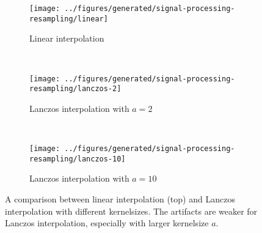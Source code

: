 

%
\begin{figure}
    \begin{subfigure}{\textwidth}
        \texttt{[image: ../figures/generated/signal-processing-resampling/linear]}
        \caption{Linear interpolation}
    \end{subfigure}
    ~
    \begin{subfigure}{\textwidth}
        \texttt{[image: ../figures/generated/signal-processing-resampling/lanczos-2]}
        \caption{Lanczos interpolation with $a=2$}
    \end{subfigure}
    ~
    \begin{subfigure}{\textwidth}
        \texttt{[image: ../figures/generated/signal-processing-resampling/lanczos-10]}
        \caption{Lanczos interpolation with $a=10$}
    \end{subfigure}
    \caption{A comparison between linear interpolation (top) and Lanczos interpolation with different kernelsizes. The artifacts are weaker for Lanczos interpolation, especially with larger kernelsize $a$.}
    \label{fig:theory:signal-processing:resampling}
\end{figure}





%
%
%

